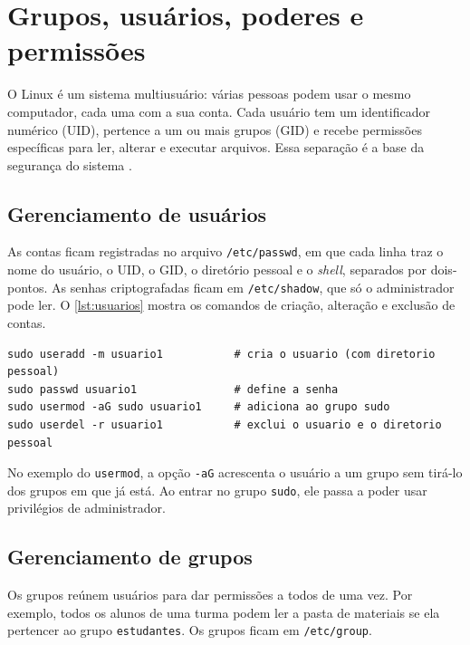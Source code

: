 \chapter{Grupos, usuários, poderes e permissões}\label{cap:permissoes}

O Linux é um sistema multiusuário: várias pessoas podem usar o mesmo computador, cada uma com
a sua conta. Cada usuário tem um identificador numérico (UID), pertence a um ou mais grupos
(GID) e recebe permissões específicas para ler, alterar e executar arquivos. Essa separação é
a base da segurança do sistema \cite{silberschatz2015}.

\section{Gerenciamento de usuários}\label{sec:usuarios}

As contas ficam registradas no arquivo \texttt{/etc/passwd}, em que cada linha traz o nome do
usuário, o UID, o GID, o diretório pessoal e o \textit{shell}, separados por dois-pontos. As
senhas criptografadas ficam em \texttt{/etc/shadow}, que só o administrador pode ler. O
\autoref{lst:usuarios} mostra os comandos de criação, alteração e exclusão de contas.

\begin{lstlisting}[caption={Gerenciamento de usuários},label={lst:usuarios}]
sudo useradd -m usuario1           # cria o usuario (com diretorio pessoal)
sudo passwd usuario1               # define a senha
sudo usermod -aG sudo usuario1     # adiciona ao grupo sudo
sudo userdel -r usuario1           # exclui o usuario e o diretorio pessoal
\end{lstlisting}

No exemplo do \texttt{usermod}, a opção \texttt{-aG} acrescenta o usuário a um grupo sem
tirá-lo dos grupos em que já está. Ao entrar no grupo \texttt{sudo}, ele passa a poder usar
privilégios de administrador.

\section{Gerenciamento de grupos}\label{sec:grupos}

Os grupos reúnem usuários para dar permissões a todos de uma vez. Por exemplo, todos os alunos
de uma turma podem ler a pasta de materiais se ela pertencer ao grupo \texttt{estudantes}. Os
grupos ficam em \texttt{/etc/group}.

